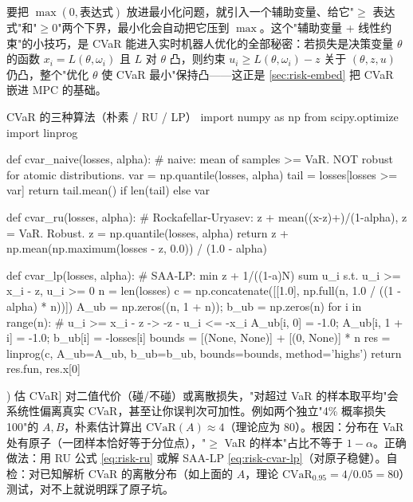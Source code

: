 \begin{insight}
要把 $\max(0,\text{表达式})$ 放进最小化问题，就引入一个辅助变量、给它"$\ge$ 表达式"和"$\ge0$"两个下界，最小化会自动把它压到 $\max$。这个"辅助变量 + 线性约束"的小技巧，是 CVaR 能进入实时机器人优化的全部秘密：若损失是决策变量 $\theta$ 的函数 $x_i=L(\theta,\omega_i)$ 且 $L$ 对 $\theta$ 凸，则约束 $u_i\ge L(\theta,\omega_i)-z$ 关于 $(\theta,z,u)$ 仍凸，整个"优化 $\theta$ 使 CVaR 最小"保持凸——这正是 \cref{sec:risk-embed} 把 CVaR 嵌进 MPC 的基础。
\end{insight}

\begin{codebox}[Python]{CVaR 的三种算法（朴素 / RU / LP）}
import numpy as np
from scipy.optimize import linprog

def cvar_naive(losses, alpha):
    # naive: mean of samples >= VaR. NOT robust for atomic distributions.
    var = np.quantile(losses, alpha)
    tail = losses[losses >= var]
    return tail.mean() if len(tail) else var

def cvar_ru(losses, alpha):
    # Rockafellar-Uryasev: z + mean((x-z)+)/(1-alpha), z = VaR. Robust.
    z = np.quantile(losses, alpha)
    return z + np.mean(np.maximum(losses - z, 0.0)) / (1.0 - alpha)

def cvar_lp(losses, alpha):
    # SAA-LP: min z + 1/((1-a)N) sum u_i  s.t. u_i >= x_i - z, u_i >= 0
    n = len(losses)
    c = np.concatenate([[1.0], np.full(n, 1.0 / ((1 - alpha) * n))])
    A_ub = np.zeros((n, 1 + n)); b_ub = np.zeros(n)
    for i in range(n):                       # u_i >= x_i - z  ->  -z - u_i <= -x_i
        A_ub[i, 0] = -1.0; A_ub[i, 1 + i] = -1.0; b_ub[i] = -losses[i]
    bounds = [(None, None)] + [(0, None)] * n
    res = linprog(c, A_ub=A_ub, b_ub=b_ub, bounds=bounds, method='highs')
    return res.fun, res.x[0]
\end{codebox}

\begin{pitfall}[编程陷阱：对有原子的损失用 mean(x[x >= VaR]) 估 CVaR]
对二值代价（碰/不碰）或离散损失，"对超过 VaR 的样本取平均"会系统性偏离真实 CVaR，甚至让你误判次可加性。例如两个独立"4\% 概率损失 100"的 $A,B$，朴素估计算出 $\mathrm{CVaR}(A)\approx4$（理论应为 $80$）。根因：分布在 VaR 处有原子（一团样本恰好等于分位点），"$\ge$ VaR 的样本"占比不等于 $1-\alpha$。正确做法：用 RU 公式 \cref{eq:risk-ru} 或解 SAA-LP \cref{eq:risk-cvar-lp}（对原子稳健）。自检：对已知解析 CVaR 的离散分布（如上面的 $A$，理论 $\mathrm{CVaR}_{0.95}=4/0.05=80$）测试，对不上就说明踩了原子坑。
\end{pitfall}

